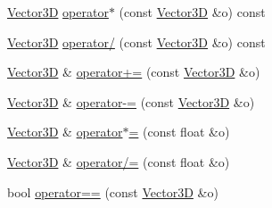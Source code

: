 \begin{DoxyCompactItemize}
\item 
\mbox{\hyperlink{struct_effekseer_1_1_vector3_d}{Vector3D}} \mbox{\hyperlink{struct_effekseer_1_1_vector3_d_ad811360923329043f3f29223f67d11ce}{operator$\ast$}} (const \mbox{\hyperlink{struct_effekseer_1_1_vector3_d}{Vector3D}} \&o) const
\item 
\mbox{\hyperlink{struct_effekseer_1_1_vector3_d}{Vector3D}} \mbox{\hyperlink{struct_effekseer_1_1_vector3_d_adcedf7fe595971f7fbbddbc846bf2462}{operator/}} (const \mbox{\hyperlink{struct_effekseer_1_1_vector3_d}{Vector3D}} \&o) const
\item 
\mbox{\hyperlink{struct_effekseer_1_1_vector3_d}{Vector3D}} \& \mbox{\hyperlink{struct_effekseer_1_1_vector3_d_ac0e5693b9a451103a3546b249b2d7547}{operator+=}} (const \mbox{\hyperlink{struct_effekseer_1_1_vector3_d}{Vector3D}} \&o)
\item 
\mbox{\hyperlink{struct_effekseer_1_1_vector3_d}{Vector3D}} \& \mbox{\hyperlink{struct_effekseer_1_1_vector3_d_a41737c64743b0f001d1a0ae502d6c0d9}{operator-\/=}} (const \mbox{\hyperlink{struct_effekseer_1_1_vector3_d}{Vector3D}} \&o)
\item 
\mbox{\hyperlink{struct_effekseer_1_1_vector3_d}{Vector3D}} \& \mbox{\hyperlink{struct_effekseer_1_1_vector3_d_a37cdddecb129f14208169a84b4fea773}{operator$\ast$=}} (const float \&o)
\item 
\mbox{\hyperlink{struct_effekseer_1_1_vector3_d}{Vector3D}} \& \mbox{\hyperlink{struct_effekseer_1_1_vector3_d_a611f802ffd7514b3f3a6b99936d371fc}{operator/=}} (const float \&o)
\item 
bool \mbox{\hyperlink{struct_effekseer_1_1_vector3_d_afa6e5af7d0a7120a8aaa05b771d759f4}{operator==}} (const \mbox{\hyperlink{struct_effekseer_1_1_vector3_d}{Vector3D}} \&o)
\end{DoxyCompactItemize}
